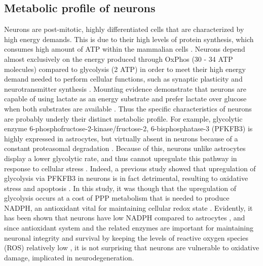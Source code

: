 \subsection{Metabolic profile of neurons}
Neurons are post-mitotic, highly differentiated cells that are characterized by high energy demands. This is due to their high levels of protein synthesis, which consumes high amount of ATP within the mammalian cells \citep{Buttgereit1995}. Neurons depend almost exclusively on the energy produced through OxPhos (30 - 34 ATP molecules) compared to glycolysis (2 ATP) in order to meet their high energy demand needed to perform cellular functions, such as synaptic plasticity and neurotransmitter synthesis \citep{Cenini2019,Mattson2008,Schonfeld2013}. Mounting evidence demonstrate that neurons are capable of using lactate as an energy substrate \citep{Boumezbeur2010,Bouzier2000,Serres2005} and prefer lactate over glucose when both substrates are available \citep{Bouzier-Sore2006,Itoh2003}. Thus the specific characteristics of neurons are probably underly their distinct metabolic profile. For example, glycolytic enzyme 6-phosphofructose-2-kinase/fructose-2, 6-bisphosphatase-3 (PFKFB3) is highly expressed in astrocytes, but virtually absent in neurons because of a constant proteasomal degradation \citep{Almeida2004,Herrero-Mendez2009}. Because of this, neurons unlike astrocytes display a lower glycolytic rate, and thus cannot upregulate this pathway in response to cellular stress \citep{Almeida2004,Herrero-Mendez2009}. Indeed, a previous study showed that upregulation of glycolysis via PFKFB3 in neurons is in fact detrimental, resulting to oxidative stress and apoptosis \citep{Herrero-Mendez2009}. In this study, it was though that the upregulation of glycolysis occurs at a cost of PPP metabolism that is needed to produce NADPH, an antioxidant vital for maintaining cellular redox state \citep{Herrero-Mendez2009}. Evidently, it has been shown that neurons have low NADPH compared to astrocytes \citep{Ben-Yoseph1996,Garcia-Nogales2003}, and since antioxidant system and the related enzymes are important for maintaining neuronal integrity and survival by keeping the levels of reactive oxygen species (ROS) relatively low \citep{Cenini2019}, it is not surprising that neurons are vulnerable to oxidative damage, implicated in neurodegeneration.

